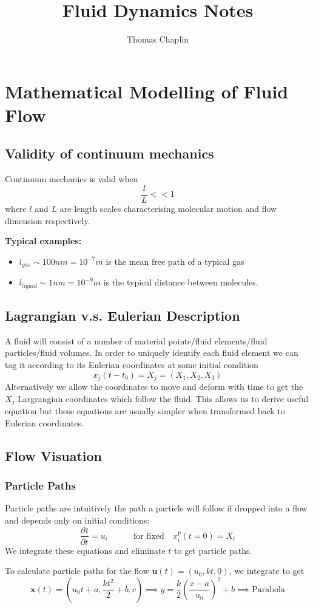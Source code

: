 \documentclass[11pt]{article}
\title{Fluid Dynamics Notes}
\author{Thomas Chaplin}
\date{}
\newcommand*{\pd}[3][]{\ensuremath{\frac{\partial^{#1} {#3}}{\partial {#3}^{#1}}}}
\newenvironment{eg}
    {\begin{mdframed}[backgroundcolor=mylg, roundcorner=5pt, linewidth=0pt]}
    {\end{mdframed}}
\newcommand{\mv}[1]{\textbf{#1}}
\begin{document}
\maketitle

\section{Mathematical Modelling of Fluid Flow}
\subsection{Validity of continuum mechanics}
Continuum mechanics is valid when
$$\frac{l}{L}<<1$$
where $l$ and $L$ are length scales characterising molecular motion and flow dimension respectively.
\begin{eg}
\textbf{Typical examples:}
\begin{itemize}
    \item $l_{gas}\sim 100nm=10^{-7}m$ is the mean free path of a typical gas
    \item $l_{liquid}\sim 1nm=10^{-9}m$ is the typical distance between molecules.
\end{itemize}
\end{eg}

\subsection{Lagrangian v.s. Eulerian Description}
A fluid will consist of a number of material points/fluid elements/fluid particles/fluid volumes.
In order to uniquely identify each fluid element we can tag it according to its Eulerian coordinates at some initial condition
$$x_j(t-t_0)=X_j=(X_1,X_2,X_3)$$
Alternatively we allow the coordinates to move and deform with time to get the $X_j$ Largrangian coordinates which follow the fluid.
This allows us to derive useful equation but these equations are usually simpler when transformed back to Eulerian coordinates.

\subsection{Flow Visuation}
\subsubsection{Particle Paths}
Particle paths are intuitively the path a particle will follow if dropped into a flow and depends only on initial conditions:
$$\pd{x_i^p}{t}=u_i \quad\quad\quad \text{for fixed} \quad x_i^p(t=0)=X_i$$
We integrate these equations and eliminate $t$ to get particle paths.
\begin{eg}
To calculate particle paths for the flow $\mv{u}(t)=(u_0,kt,0)$, we integrate to get
$$\mv{x}(t)=(u_0t+a,\frac{kt^2}{2}+b,c)\implies y=\frac{k}{2}\left(\frac{x-a}{u_0}\right)^2+b\implies\text{Parabola}$$
\end{eg}
\end{document}
